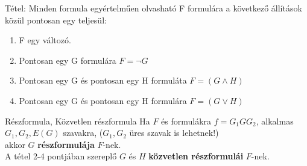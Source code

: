 \documentclass{beamer}
\begin{document}
\begin{frame}

\begin{block}{Tétel: Minden formula egyértelműen olvasható}
F formulára a következő állítások közül pontosan egy teljesül:

\begin{enumerate}
\item F egy változó.
\item Pontosan egy G formulára $F = \neg G$
\item Pontosan egy G és pontosan egy H formuláta $F = (G \land H)$
\item Pontosan egy G és pontosan egy H formulára $F = (G \lor H)$
\end{enumerate}

\end{block}

\end{frame}

\begin{frame}

\begin{block}{Részformula, Közvetlen részformula}
Ha $F$ és formulákra  $f = G_1GG_2$, alkalmas $G_1, G_2, E(G)$ szavakra, ($G_1, G_2$ üres szavak is lehetnek!)\\
akkor $G$ \textbf{részformulája} $F$-nek.\\
\bigskip
A tétel 2-4 pontjában szereplő $G$ és $H$ \textbf{közvetlen részformulái} $F$-nek.

\end{block}

\end{frame}
\end{document}
